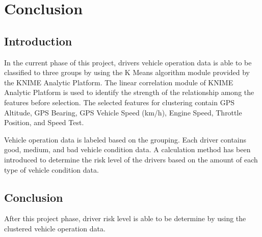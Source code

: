\chapter{Conclusion}
\section{Introduction}

In the current phase of this project, drivers vehicle operation data is able to be classified to three groups by using the K Means algorithm module provided by the KNIME Analytic Platform. The linear correlation module of KNIME Analytic Platform is used to identify the strength of the relationship among the features before selection. The selected features for clustering contain GPS Altitude, GPS Bearing, GPS Vehicle Speed (km/h), Engine Speed, Throttle Position, and Speed Test.

Vehicle operation data is labeled based on the grouping. Each driver contains good, medium, and bad vehicle condition data. A calculation method has been introduced to determine the risk level of the drivers based on the amount of each type of vehicle condition data.

\section{Conclusion}

After this project phase, driver risk level is able to be determine by using the clustered vehicle operation data.
